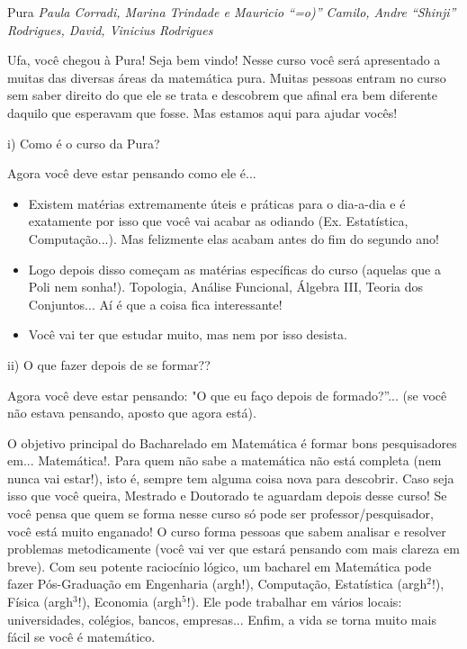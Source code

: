 \begin{subsecao}{Pura}
{\em Paula Corradi, Marina Trindade e Mauricio ``=o)'' Camilo,
Andre “Shinji” Rodrigues, David, Vinicius Rodrigues}


Ufa, você chegou à Pura! Seja bem vindo! Nesse curso você será apresentado a muitas das diversas áreas da matemática pura. Muitas pessoas entram no curso sem saber direito do que ele se trata e descobrem que afinal era bem diferente daquilo que esperavam que fosse. Mas estamos aqui para ajudar vocês!

i) Como é o curso da Pura?

Agora você deve estar pensando como ele é...
\begin{itemize}


\item  Existem matérias extremamente úteis e práticas para o dia-a-dia e é
exatamente por isso que você vai acabar as odiando (Ex. Estatística, 
Computação...). Mas felizmente elas acabam antes do fim do segundo ano!
\item  Logo depois disso começam as matérias específicas do curso (aquelas que a Poli nem sonha!). Topologia, Análise Funcional, Álgebra III, Teoria dos Conjuntos... Aí é que a coisa fica interessante!
\item  Você vai ter que estudar muito, mas nem por isso desista.

\end{itemize}
ii) O que fazer depois de se formar??

Agora você deve estar pensando: "O que eu faço depois de formado?”... (se você
não estava pensando, aposto que agora está).

O objetivo principal do Bacharelado em Matemática é formar bons pesquisadores em... Matemática!. Para quem não
sabe a matemática não está completa (nem nunca vai estar!), isto é, sempre tem alguma coisa nova para
descobrir. Caso seja isso que você queira, Mestrado e Doutorado te aguardam depois desse curso! Se você pensa que quem se forma nesse curso só pode ser
professor/pesquisador, você está muito enganado! O curso forma pessoas que
sabem analisar e resolver problemas metodicamente (você vai ver que estará
pensando com mais clareza em breve). Com seu potente raciocínio lógico, um
bacharel em Matemática pode fazer Pós-Graduação em Engenharia (argh!),
Computação, Estatística (argh$^2$!), Física (argh$^3$!), Economia (argh$^5$!).
Ele pode trabalhar em vários locais: universidades, colégios, bancos,
empresas... Enfim, a vida se torna muito mais fácil se você é matemático.


\end{subsecao}
